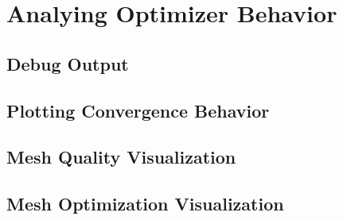 \chapter{Analying Optimizer Behavior}

\section{Debug Output}

\section{Plotting Convergence Behavior}

\section{Mesh Quality Visualization}

\section{Mesh Optimization Visualization}
